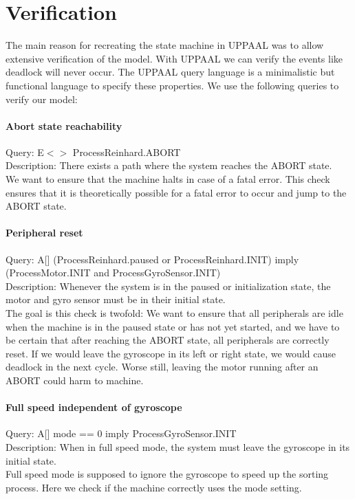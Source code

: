 \documentclass[a4paper,oneside,11pt]{article}
\begin{document}
\section{Verification}
The main reason for recreating the state machine in UPPAAL was to allow extensive verification of the model. With UPPAAL we can verify the events like deadlock will never occur. The UPPAAL query language is a minimalistic but functional language to specify these properties. We use the following queries to verify our model:

\paragraph{Abort state reachability}
Query: E$<>$ ProcessReinhard.ABORT \\
Description: There exists a path where the system reaches the ABORT state.\\
We want to ensure that the machine halts in case of a fatal error. This check ensures that it is theoretically possible for a fatal error to occur and jump to the ABORT state.

\paragraph{Peripheral reset}
Query: A[] (ProcessReinhard.paused or ProcessReinhard.INIT) imply (ProcessMotor.INIT and ProcessGyroSensor.INIT) \\
Description: Whenever the system is in the paused or initialization state, the motor and gyro sensor must be in their initial state. \\
The goal is this check is twofold: We want to ensure that all peripherals are idle when the machine is in the paused state or has not yet started, and we have to be certain that after reaching the ABORT state, all peripherals are correctly reset. If we would leave the gyroscope in its left or right state, we would cause deadlock in the next cycle. Worse still, leaving the motor running after an ABORT could harm to machine.

\paragraph{Full speed independent of gyroscope}
Query: A[] mode == 0 imply ProcessGyroSensor.INIT \\
Description: When in full speed mode, the system must leave the gyroscope in its initial state. \\
Full speed mode is supposed to ignore the gyroscope to speed up the sorting process. Here we check if the machine correctly uses the mode setting.
\end{document}
